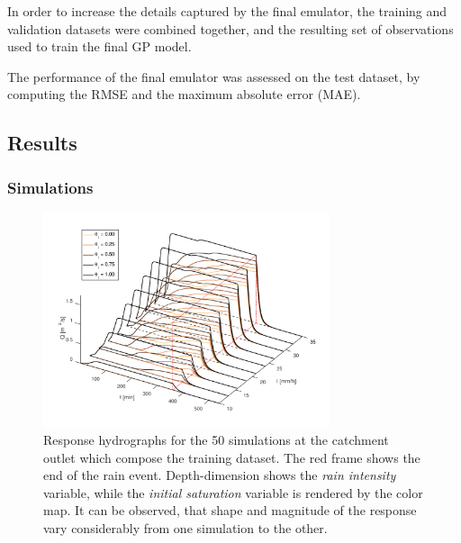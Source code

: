In order to increase the details captured by the final emulator, the training and validation datasets were combined together, and the resulting set of observations used to train the final GP model. 
 
The performance of the final emulator was assessed on the test dataset, by computing the RMSE and the maximum absolute error (MAE).

\subsection{Results}
\subsubsection{Simulations}\label{sec:simulations_results}

\begin{figure}[h]
  \centering
  \includegraphics[width=0.75\textwidth]{Figures/hydrographs3d.png}
  \caption{Response hydrographs for the \num{50} simulations at the catchment outlet which compose the training dataset. The red frame shows the end of the rain event. Depth-dimension shows the \emph{rain intensity} variable, while the \emph{initial saturation} variable is rendered by the color map. It can be observed, that shape and magnitude of the response vary considerably from one simulation to the other.}
  \label{fig:hydrographs3d}
\end{figure}


